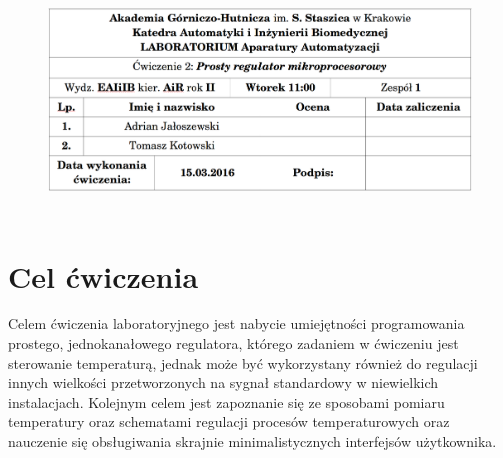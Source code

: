 \documentclass[a4paper, 12pt]{article}
\begin{document}
	\begin{figure}[H]
		\centering
		\includegraphics[height=6cm, width=\textwidth]{./img/lena.png}
	\end{figure}
	\section{Cel ćwiczenia}
		Celem ćwiczenia laboratoryjnego jest nabycie umiejętności programowania prostego, jednokanałowego regulatora, którego zadaniem w ćwiczeniu jest sterowanie temperaturą, jednak może być wykorzystany również do regulacji innych wielkości przetworzonych na sygnał standardowy w niewielkich instalacjach. Kolejnym celem jest zapoznanie się ze sposobami pomiaru temperatury oraz schematami regulacji procesów temperaturowych oraz nauczenie się obsługiwania skrajnie minimalistycznych interfejsów użytkownika. 
\end{document}
